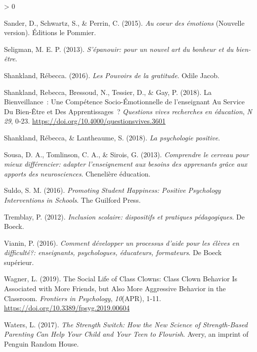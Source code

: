 \documentclass[
  french,
]{article}
\newlength{\cslhangindent}
\newenvironment{CSLReferences}[2] %
 {%
  \setlength{\parindent}{0pt}
  \ifodd #1 \everypar{\setlength{\hangindent}{\cslhangindent}}\ignorespaces\fi
  \ifnum #2 > 0
  \setlength{\parskip}{#2\baselineskip}
  \fi
 }%
 {}
\begin{document}
\begin{CSLReferences}{1}{0}
\leavevmode\hypertarget{ref-sander2015}{}%
Sander, D., Schwartz, S., \& Perrin, C. (2015). \emph{{Au coeur des émotions}} (Nouvelle version). {Éditions le Pommier}.

\leavevmode\hypertarget{ref-seligman2013a}{}%
Seligman, M. E. P. (2013). \emph{{S'épanouir: pour un nouvel art du bonheur et du bien-être}}.

\leavevmode\hypertarget{ref-shankland2016a}{}%
Shankland, Rébecca. (2016). \emph{{Les Pouvoirs de la gratitude}}. {Odile Jacob}.

\leavevmode\hypertarget{ref-shankland2018a}{}%
Shankland, Rebecca, Bressoud, N., Tessier, D., \& Gay, P. (2018). La Bienveillance~: Une Compétence Socio-Émotionnelle de l'enseignant Au Service Du Bien-Être et Des Apprentissages~? \emph{Questions vives recherches en éducation}, \emph{N{} 29}, 0‑23. \url{https://doi.org/10.4000/questionsvives.3601}

\leavevmode\hypertarget{ref-shankland2018b}{}%
Shankland, Rébecca, \& Lantheaume, S. (2018). \emph{{La psychologie positive}}.

\leavevmode\hypertarget{ref-sousa2013}{}%
Sousa, D. A., Tomlinson, C. A., \& Sirois, G. (2013). \emph{{Comprendre le cerveau pour mieux différencier: adapter l'enseignement aux besoins des apprenants grâce aux apports des neurosciences}}. {Chenelière éducation}.

\leavevmode\hypertarget{ref-suldo2016a}{}%
Suldo, S. M. (2016). \emph{Promoting Student Happiness: Positive Psychology Interventions in Schools}. {The Guilford Press}.

\leavevmode\hypertarget{ref-tremblay2012}{}%
Tremblay, P. (2012). \emph{{Inclusion scolaire: dispositifs et pratiques pédagogiques}}. {De Boeck}.

\leavevmode\hypertarget{ref-vianin2016}{}%
Vianin, P. (2016). \emph{{Comment développer un processus d'aide pour les élèves en difficulté?: enseignants, psychologues, éducateurs, formateurs}}. {De Boeck supérieur}.

\leavevmode\hypertarget{ref-wagner2019a}{}%
Wagner, L. (2019). The Social Life of Class Clowns: {Class} Clown Behavior Is Associated with More Friends, but Also More Aggressive Behavior in the Classroom. \emph{Frontiers in Psychology}, \emph{10}(APR), 1‑11. \url{https://doi.org/10.3389/fpsyg.2019.00604}

\leavevmode\hypertarget{ref-waters2017}{}%
Waters, L. (2017). \emph{The Strength Switch: How the New Science of Strength-Based Parenting Can Help Your Child and Your Teen to Flourish}. {Avery, an imprint of Penguin Random House}.


\end{CSLReferences}
\end{document}

